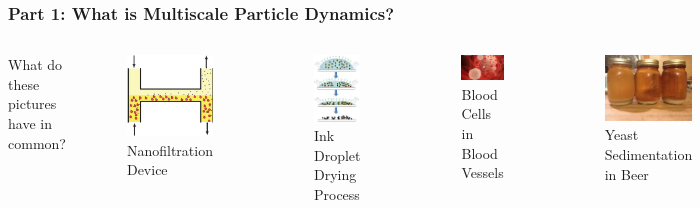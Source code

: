 \documentclass[aspectratio=169,xcolor=dvipsnames]{beamer}
\begin{document}
\begin{frame}
	\frametitle{Part 1: What is Multiscale Particle Dynamics?}
	
	\begin{columns}
		What do these pictures have in common?\\
		
		\begin{columns}	
			\begin{figure}
				\includegraphics[width=4cm]{Microfilter.png}
				\caption{ Nanofiltration Device}
			\end{figure}
			\begin{figure}		
				\includegraphics[width=4cm]{printing1.png}
				\caption{Ink Droplet Drying Process}
			\end{figure}
		\end{columns}
		
		\begin{figure}
			\includegraphics[width=3cm]{bloodcells.jpg}
			\caption{Blood Cells in Blood Vessels}
		\end{figure}
		\begin{figure}
			\includegraphics[width=3cm]{beer.jpg}
			\caption{Yeast Sedimentation in Beer}
		\end{figure}
		
	\end{columns}
\end{frame}
\end{document}

